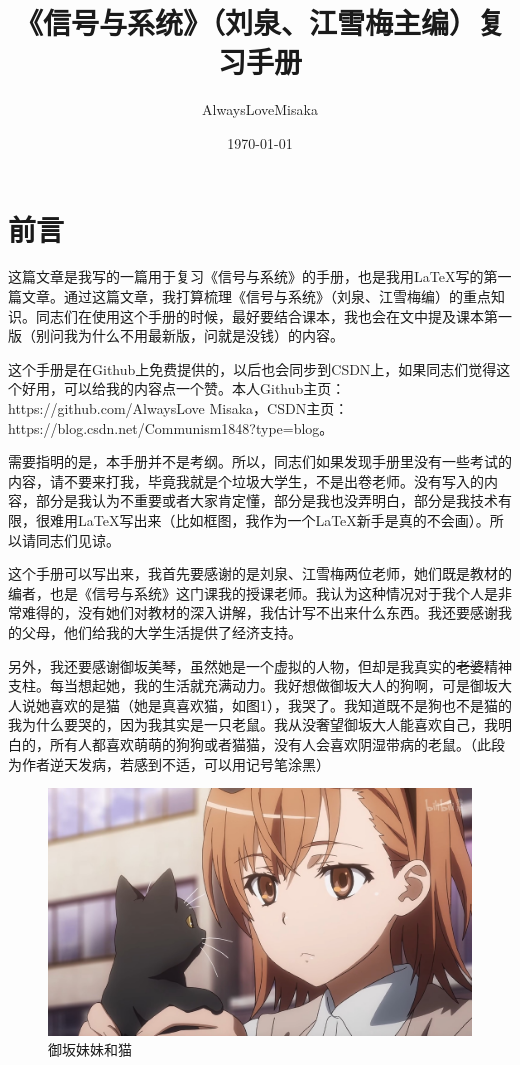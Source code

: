 \documentclass[UTF8,a4paper,11pt]{article}
\title{\huge\heiti《信号与系统》（刘泉、江雪梅主编）复习手册}
\author{AlwaysLoveMisaka}
\date{\today}
\begin{document}
\maketitle
\thispagestyle{empty}
\clearpage

\tableofcontents
\thispagestyle{empty}
\clearpage

\setcounter{page}{1}
\section{前言}
这篇文章是我写的一篇用于复习《信号与系统》的手册，也是我用\LaTeX 写的第一篇文章。通过这篇文章，我打算梳理《信号与系统》（刘泉、江雪梅编）的重点知识。同志们在使用这个手册的时候，最好要结合课本，我也会在文中提及课本第一版（别问我为什么不用最新版，问就是没钱）的内容。

这个手册是在Github上免费提供的，以后也会同步到CSDN上，如果同志们觉得这个好用，可以给我的内容点一个赞。本人Github主页：https://github.com/AlwaysLove Misaka，CSDN主页：https://blog.csdn.net/Communism1848?type=blog。

需要指明的是，本手册并不是考纲。所以，同志们如果发现手册里没有一些考试的内容，请不要来打我，毕竟我就是个垃圾大学生，不是出卷老师。没有写入的内容，部分是我认为不重要或者大家肯定懂，部分是我也没弄明白，部分是我技术有限，很难用\LaTeX 写出来（比如框图，我作为一个\LaTeX 新手是真的不会画）。所以请同志们见谅。

这个手册可以写出来，我首先要感谢的是刘泉、江雪梅两位老师，她们既是教材的编者，也是《信号与系统》这门课我的授课老师。我认为这种情况对于我个人是非常难得的，没有她们对教材的深入讲解，我估计写不出来什么东西。我还要感谢我的父母，他们给我的大学生活提供了经济支持。

另外，我还要感谢御坂美琴，虽然她是一个虚拟的人物，但却是我真实的\sout{老婆}精神支柱。每当想起她，我的生活就充满动力。我好想做御坂大人的狗啊，可是御坂大人说她喜欢的是猫（她是真喜欢猫，如图1），我哭了。我知道既不是狗也不是猫的我为什么要哭的，因为我其实是一只老鼠。我从没奢望御坂大人能喜欢自己，我明白的，所有人都喜欢萌萌的狗狗或者猫猫，没有人会喜欢阴湿带病的老鼠。（此段为作者逆天发病，若感到不适，可以用记号笔涂黑）
\newline
\begin{figure}[htbp]
\centering
\includegraphics[scale=0.2]{cat.jpg}
\caption{御坂妹妹和猫}
\end{figure}
\end{document}
